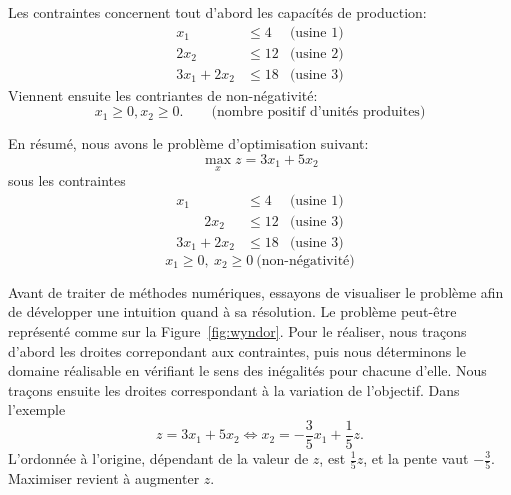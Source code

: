 \begin{example}
Les contraintes concernent tout d'abord les capacítés de production:
\begin{eqnarray*}
x_1 & \leq 4 & \mbox{(usine 1)} \\
2x_2 & \leq 12 & \mbox{(usine 2)} \\
3x_1 + 2x_2 & \leq 18  & \mbox{(usine 3)}
\end{eqnarray*}
Viennent ensuite les contriantes de non-négativité:
\[
x_1 \geq 0, x_2 \geq 0. \qquad \mbox{(nombre positif d'unités produites)}
\]

En résumé, nous avons le problème d'optimisation suivant:
\[
\max_x z = 3x_1 + 5x_2
\]
sous les contraintes
\begin{eqnarray*}
x_1\qquad & \leq 4 & \mbox{(usine 1)} \\
 \qquad  2x_2 & \leq 12 & \mbox{(usine 3)} \\
3x_1 + 2x_2 & \leq 18 & \mbox{(usine 3)}
\end{eqnarray*}
\[
x_1 \geq 0,\ x_2 \geq 0\ \mbox{(non-négativité)}
\]

Avant de traiter de méthodes numériques, essayons de visualiser le problème afin de développer une intuition quand à sa résolution.
Le problème peut-être représenté comme sur la Figure~\ref{fig:wyndor}.
Pour le réaliser, nous traçons d'abord les droites correpondant aux contraintes, puis nous déterminons le domaine réalisable en vérifiant le sens des inégalités pour chacune d'elle.
Nous traçons ensuite les droites correspondant à la variation de l'objectif.
Dans l'exemple
\[
z = 3x_1+5x_2 \Leftrightarrow x_2 = -\frac{3}{5}x_1 + \frac{1}{5}z.
\]
L'ordonnée à l'origine, dépendant de la valeur de $z$, est $\frac{1}{5}z$, et la pente vaut $-\frac{3}{5}$.
Maximiser revient à augmenter $z$.
\begin{figure}[htbp]
\begin{center}
\end{center}
\end{figure}
\end{example}
